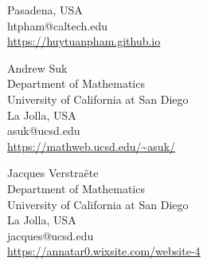 \documentclass{daj}
\begin{document}
\begin{dajauthors}
\begin{authorinfo}[htp]
  Pasadena, USA\\
  htpham@caltech.edu \\
  \url{https://huytuanpham.github.io}
\end{authorinfo}
\begin{authorinfo}[as]
  Andrew Suk\\
  Department of Mathematics\\ 
  University of California at San Diego\\ 
  La Jolla, USA\\
  asuk@ucsd.edu \\
  \url{https://mathweb.ucsd.edu/~asuk/}
\end{authorinfo}
\begin{authorinfo}[jv]
  Jacques Verstra\"ete\\
  Department of Mathematics\\ 
  University of California at San Diego\\ 
  La Jolla, USA\\
  jacques@ucsd.edu \\
  \url{https://annatar0.wixsite.com/website-4}
\end{authorinfo}
\end{dajauthors}
\end{document}
